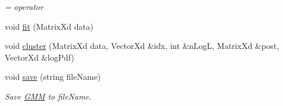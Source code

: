 \begin{DoxyCompactItemize}
\begin{DoxyCompactList}\small\item\em = operator \end{DoxyCompactList}\item 
void \hyperlink{class_g_m_m_a8da11088f8e7371786a80d64fc21e378}{fit} (Matrix\+Xd data)
\item 
void \hyperlink{class_g_m_m_a520a9559626e08e3cb4e9863262da300}{cluster} (Matrix\+Xd data, Vector\+Xd \&idx, int \&n\+Log\+L, Matrix\+Xd \&post, Vector\+Xd \&log\+Pdf)
\item 
\hypertarget{class_g_m_m_af57b5c21205ecd53619f67117555388e}{void \hyperlink{class_g_m_m_af57b5c21205ecd53619f67117555388e}{save} (string file\+Name)}\label{class_g_m_m_af57b5c21205ecd53619f67117555388e}

\begin{DoxyCompactList}\small\item\em Save \hyperlink{class_g_m_m}{G\+M\+M} to file\+Name. \end{DoxyCompactList}\end{DoxyCompactItemize}


